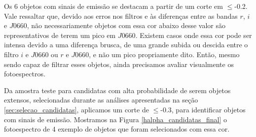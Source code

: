 

Os 6 objetos com sinais de emissão se destacam a partir de um corte em $\leq$-0.2. Vale ressaltar que, devido aos erros nos filtros e às diferenças entre as bandas $r$, $i$ e $J0660$, não necessariamente objetos com essa cor abaixo desse valor são representativos de terem um pico em $J0660$. Existem casos onde essa cor pode ser intensa devido a uma diferença brusca, de uma grande subida ou descida entre o filtro $i$ e $J0660$ ou $r$ e $J0660$, e não um pico propriamente dito. Então, mesmo sendo capaz de filtrar esses objetos, ainda precisamos avaliar visualmente os fotoespectros.

Da amostra teste para candidatas com alta probabilidade de serem objetos extensos, selecionadas durante as análises apresentadas na seção \ref{sec:selecao_candidatas}, aplicamos um corte de $\leq$-0.3, para identificar objetos com sinais de emissão. Mostramos na Figura \ref{halpha_candidatas_final} o fotoespectro de 4 exemplo de objetos que foram selecionados com essa cor.


